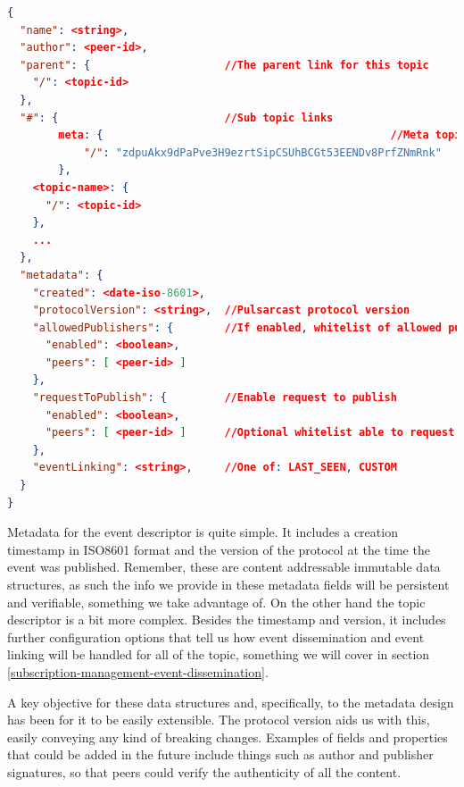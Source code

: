 \noindent\begin{minipage}{\textwidth}
\vspace{8pt}
\begin{lstlisting}[language=JSON,caption={Topic descriptor schema in a JSON based format},label={topic-descriptor},captionpos=b]
{
  "name": <string>,
  "author": <peer-id>,
  "parent": {                     //The parent link for this topic
    "/": <topic-id>
  },
  "#": {                          //Sub topic links
		meta: {												//Meta topic
			"/": "zdpuAkx9dPaPve3H9ezrtSipCSUhBCGt53EENDv8PrfZNmRnk"
		},
    <topic-name>: {
      "/": <topic-id>
    },
    ...
  },
  "metadata": {
    "created": <date-iso-8601>,
    "protocolVersion": <string>,  //Pulsarcast protocol version
    "allowedPublishers": {        //If enabled, whitelist of allowed publishers
      "enabled": <boolean>,
      "peers": [ <peer-id> ]
    },
    "requestToPublish": {         //Enable request to publish
      "enabled": <boolean>,
      "peers": [ <peer-id> ]      //Optional whitelist able to request
    },
    "eventLinking": <string>,     //One of: LAST_SEEN, CUSTOM
  }
}
\end{lstlisting}
\vspace{8pt}
\end{minipage}

Metadata for the event descriptor is quite simple. It includes a creation
timestamp in ISO8601 format and the version of the protocol at the time the
event was published. Remember, these are content addressable immutable data
structures, as such the info we provide in these metadata fields will be
persistent and verifiable, something we take advantage of. On the other hand
the topic descriptor is a bit more complex. Besides the timestamp and version,
it includes further configuration options that tell us how event dissemination
and event linking will be handled for all of the topic, something we will cover
in section \ref{subscription-management-event-dissemination}.

A key objective for these data structures and, specifically, to the metadata
design has been for it to be easily extensible. The protocol version aids us
with this, easily conveying any kind of breaking changes. Examples of fields
and properties that could be added in the future include things such as author
and publisher signatures, so that peers could verify the authenticity of all
the content.

